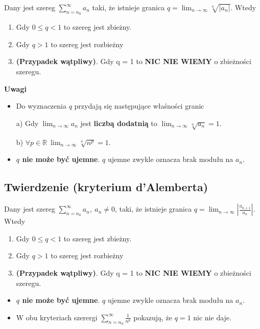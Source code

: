 Dany jest szereg $ \sum\limits_{n = n_0}^{\infty} a_n $ taki, że istnieje granica $ q = \lim_{n \to \infty} \sqrt[n]{|a_n|} $. Wtedy

\begin{enumerate}
    \item Gdy $ 0 \leq q < 1 $ to szereg jest zbieżny.
    \item Gdy $ q > 1 $ to szereg jest rozbieżny
    \item \textbf{(Przypadek wątpliwy)}. Gdy q = 1 to \textbf{NIC NIE WIEMY} o zbieżności szeregu. \\
\end{enumerate}

\textbf{Uwagi}

\begin{itemize}
    \item Do wyznaczenia $q$ przydają się następujące właśności granic
    
    a) Gdy $ \lim_{n \to \infty} a_n $ jest \textbf{liczbą dodatnią} to $ \lim_{n \to \infty} \sqrt[n]{a_n} = 1 $.

    b) $ \forall p \in \mathbb{R} \ \lim_{n \to \infty} \sqrt[n]{n^p} = 1 $.

    \item \textbf{$q$ nie może być ujemne}. $q$ ujemne zwykle oznacza brak modułu na $a_n$.
\end{itemize}


\subsection*{Twierdzenie (kryterium d'Alemberta)}

Dany jest szereg $ \sum\limits_{n = n_0}^{\infty} a_n, \ a_n \neq 0 $, taki, że istnieje granica
$ q = \lim_{n \to \infty} \left| \frac{a_{n + 1}}{a_n} \right| $. Wtedy

\begin{enumerate}
    \item Gdy $ 0 \leq q < 1 $ to szereg jest zbieżny.
    \item Gdy $ q > 1 $ to szereg jest rozbieżny
    \item \textbf{(Przypadek wątpliwy)}. Gdy q = 1 to \textbf{NIC NIE WIEMY} o zbieżności szeregu. \\
\end{enumerate}

\begin{itemize}
    \item \textbf{$q$ nie może być ujemne}. $q$ ujemne zwykle oznacza brak modułu na $a_n$.
    
    \item W obu kryteriach szerergi $ \sum\limits_{n = n_0}^{\infty} \frac{1}{n^p} $ pokazują, że $ q = 1$ nic nie daje. \\
\end{itemize}

